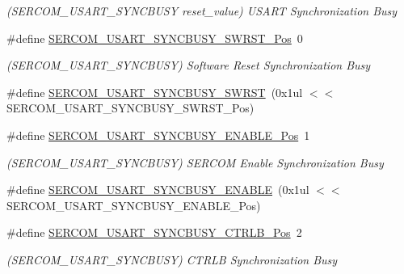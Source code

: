 \begin{DoxyCompactItemize}
\begin{DoxyCompactList}\small\item\em (S\+E\+R\+C\+O\+M\+\_\+\+U\+S\+A\+R\+T\+\_\+\+S\+Y\+N\+C\+B\+U\+SY reset\+\_\+value) U\+S\+A\+RT Synchronization Busy \end{DoxyCompactList}\item 
\#define \mbox{\hyperlink{group___s_a_m_d21___s_e_r_c_o_m_ga02616f7f7ba7269e23c1beee065d41e2}{S\+E\+R\+C\+O\+M\+\_\+\+U\+S\+A\+R\+T\+\_\+\+S\+Y\+N\+C\+B\+U\+S\+Y\+\_\+\+S\+W\+R\+S\+T\+\_\+\+Pos}}~0
\begin{DoxyCompactList}\small\item\em (S\+E\+R\+C\+O\+M\+\_\+\+U\+S\+A\+R\+T\+\_\+\+S\+Y\+N\+C\+B\+U\+SY) Software Reset Synchronization Busy \end{DoxyCompactList}\item 
\#define \mbox{\hyperlink{group___s_a_m_d21___s_e_r_c_o_m_gae87d09ebe0ef63c3b76fc785797bd1d6}{S\+E\+R\+C\+O\+M\+\_\+\+U\+S\+A\+R\+T\+\_\+\+S\+Y\+N\+C\+B\+U\+S\+Y\+\_\+\+S\+W\+R\+ST}}~(0x1ul $<$$<$ S\+E\+R\+C\+O\+M\+\_\+\+U\+S\+A\+R\+T\+\_\+\+S\+Y\+N\+C\+B\+U\+S\+Y\+\_\+\+S\+W\+R\+S\+T\+\_\+\+Pos)
\item 
\#define \mbox{\hyperlink{group___s_a_m_d21___s_e_r_c_o_m_gaf98186a88e5c2e212b786c7415a010a6}{S\+E\+R\+C\+O\+M\+\_\+\+U\+S\+A\+R\+T\+\_\+\+S\+Y\+N\+C\+B\+U\+S\+Y\+\_\+\+E\+N\+A\+B\+L\+E\+\_\+\+Pos}}~1
\begin{DoxyCompactList}\small\item\em (S\+E\+R\+C\+O\+M\+\_\+\+U\+S\+A\+R\+T\+\_\+\+S\+Y\+N\+C\+B\+U\+SY) S\+E\+R\+C\+OM Enable Synchronization Busy \end{DoxyCompactList}\item 
\#define \mbox{\hyperlink{group___s_a_m_d21___s_e_r_c_o_m_gaa275148c1745133f850ab3956f1f7498}{S\+E\+R\+C\+O\+M\+\_\+\+U\+S\+A\+R\+T\+\_\+\+S\+Y\+N\+C\+B\+U\+S\+Y\+\_\+\+E\+N\+A\+B\+LE}}~(0x1ul $<$$<$ S\+E\+R\+C\+O\+M\+\_\+\+U\+S\+A\+R\+T\+\_\+\+S\+Y\+N\+C\+B\+U\+S\+Y\+\_\+\+E\+N\+A\+B\+L\+E\+\_\+\+Pos)
\item 
\#define \mbox{\hyperlink{group___s_a_m_d21___s_e_r_c_o_m_gaad7bfdc9a09c4a18277f2cfc807ff9bf}{S\+E\+R\+C\+O\+M\+\_\+\+U\+S\+A\+R\+T\+\_\+\+S\+Y\+N\+C\+B\+U\+S\+Y\+\_\+\+C\+T\+R\+L\+B\+\_\+\+Pos}}~2
\begin{DoxyCompactList}\small\item\em (S\+E\+R\+C\+O\+M\+\_\+\+U\+S\+A\+R\+T\+\_\+\+S\+Y\+N\+C\+B\+U\+SY) C\+T\+R\+LB Synchronization Busy \end{DoxyCompactList}\item 

\end{DoxyCompactItemize}
